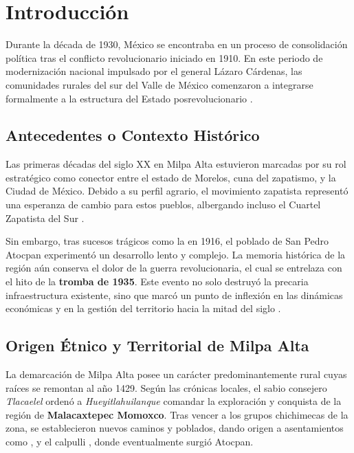 
\section{Introducción}
\label{sec:introduccion}
Durante la década de 1930, México se encontraba en un proceso de consolidación política 
tras el conflicto revolucionario iniciado en 1910. En este periodo de modernización 
nacional impulsado por el general Lázaro Cárdenas, las comunidades rurales del sur del 
Valle de México comenzaron a integrarse formalmente a la estructura del Estado 
posrevolucionario \cite{lopez2017indigenas}.

\subsection{Antecedentes o Contexto Histórico}
\label{sec:antescendetes}

Las primeras décadas del siglo XX en Milpa Alta estuvieron marcadas por su rol 
estratégico como conector entre el estado de Morelos, cuna del zapatismo, y la Ciudad de 
México. Debido a su perfil agrario, el movimiento zapatista representó una 
esperanza de cambio para estos pueblos, albergando incluso el Cuartel Zapatista del Sur
\cite{fundacionunam2020historia}.

Sin embargo, tras sucesos trágicos como la  en 1916, 
el poblado de San Pedro Atocpan experimentó un desarrollo lento y complejo. 
La memoria histórica de la región aún conserva el dolor de la guerra revolucionaria, 
el cual se entrelaza con el hito de la \textbf{tromba de 1935}. 
Este evento no solo destruyó la precaria infraestructura existente, sino que marcó un 
punto de inflexión en las dinámicas económicas y en la gestión del territorio hacia la 
mitad del siglo \cite{santuarioSFtesoro}.

\subsection{Origen Étnico y Territorial de Milpa Alta}
\label{sec:origen-etnico}

La demarcación de Milpa Alta posee un carácter predominantemente rural cuyas raíces 
se remontan al año 1429. Según las crónicas locales, el sabio consejero 
\textit{Tlacaelel} ordenó a \textit{Hueyitlahuilanque} comandar la exploración y 
conquista de la región de \textbf{Malacaxtepec Momoxco}. Tras vencer a los grupos 
chichimecas de la zona, se establecieron nuevos caminos y poblados, dando origen a 
asentamientos como ,  y el calpulli 
, donde eventualmente surgió Atocpan.

